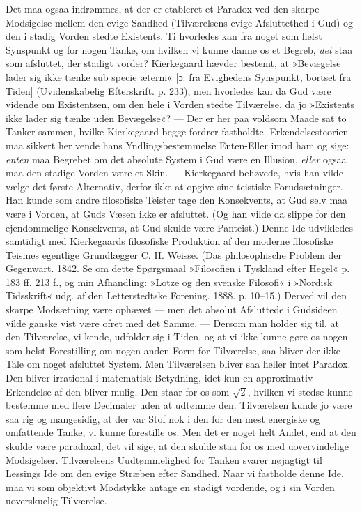 \documentclass[12pt,a4paper,openany]{book}
\newcommand{\opage}[1]{\marginnote{\footnotesize\textit{[#1]}}}
\begin{document}
Det maa ogsaa indrømmes, at der er etableret et
Paradox ved den skarpe Modsigelse mellem den evige
Sandhed (Tilværelsens evige Afsluttethed i Gud) og den
i stadig Vorden stedte Existents. Ti hvorledes kan fra
noget som helst Synspunkt og for nogen Tanke, om
hvilken vi kunne danne os et Begreb, \textit{det} staa som afsluttet,
der stadigt vorder? Kierkegaard hævder bestemt,
at »Bevægelse lader sig ikke tænke sub specie æterni«
[ɔ: fra Evighedens Synspunkt, bortset fra Tiden] (Uvidenskabelig
Efterskrift. p. 233), men hvorledes kan da
Gud være vidende om Existentsen, om den hele i Vorden
stedte Tilværelse, da jo »Existents ikke lader sig tænke
uden Bevægelse«? --- Der er her paa voldsom Maade
sat to Tanker sammen, hvilke Kierkegaard begge fordrer
fastholdte. Erkendelsesteorien maa sikkert her vende
hans Yndlingsbestemmelse Enten-Eller imod ham og sige:
\textit{enten} maa Begrebet om det absolute System i Gud være
en Illusion, \textit{eller} ogsaa maa den stadige Vorden være et
Skin. --- Kierkegaard behøvede, hvis han vilde vælge
det første Alternativ, derfor ikke at opgive sine teistiske
Forudsætninger. Han kunde som andre filosofiske Teister
\opage{65}tage den Konsekvents, at Gud selv maa være i Vorden,
at Guds Væsen ikke er afsluttet. (Og han vilde da
slippe for den ejendommelige Konsekvents, at Gud skulde
være Panteist.) Denne Ide udvikledes samtidigt med
Kierkegaards filosofiske Produktion af den moderne filosofiske
Teismes egentlige Grundlægger C. H. Weisse.
(Das philosophische Problem der Gegenwart. 1842.
Se om dette Spørgsmaal »Filosofien i Tyskland efter
Hegel« p. 183 ff. 213 f., og min Afhandling: »Lotze og
den svenske Filosofi« i »Nordisk Tidsskrift« udg. af den
Letterstedtske Forening. 1888. p. 10--15.) Derved vil
den skarpe Modsætning være ophævet --- men det absolut
Afsluttede i Gudsideen vilde ganske vist være ofret med
det Samme. --- Dersom man holder sig til, at den Tilværelse,
vi kende, udfolder sig i Tiden, og at vi ikke
kunne gøre os nogen som helst Forestilling om nogen
anden Form for Tilværelse, saa bliver der ikke Tale om
noget afsluttet System. Men Tilværelsen bliver saa
heller intet Paradox. Den bliver irrational i matematisk
Betydning, idet kun en approximativ Erkendelse af den
bliver mulig. Den staar for os som $\sqrt{2}$, hvilken vi stedse
kunne bestemme med flere Decimaler uden at udtømme
den. Tilværelsen kunde jo være saa rig og mangesidig,
at der var Stof nok i den for den mest energiske og omfattende
Tanke, vi kunne forestille os. Men det er noget
helt Andet, end at den skulde være paradoxal, det vil
sige, at den skulde staa for os med uovervindelige Modsigelser.
Tilværelsens Uudtømmelighed for Tanken svarer
nøjagtigt til Lessings Ide om den evige Stræben efter
Sandhed. Naar vi fastholde denne Ide, maa vi som
objektivt Modstykke antage en stadigt vordende, og i sin
Vorden uoverskuelig Tilværelse. ---
\end{document}
